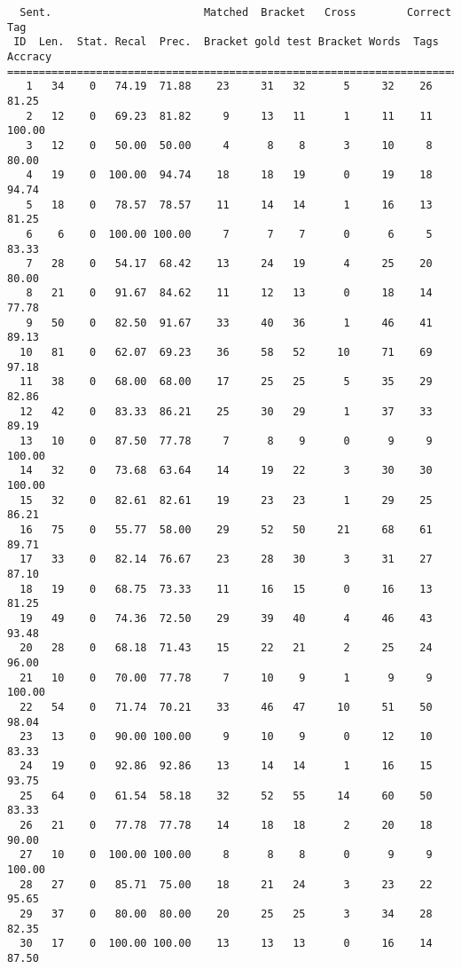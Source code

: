\scriptsize
\begin{verbatim}
  Sent.                        Matched  Bracket   Cross        Correct Tag
 ID  Len.  Stat. Recal  Prec.  Bracket gold test Bracket Words  Tags Accracy
============================================================================
   1   34    0   74.19  71.88    23     31   32      5     32    26    81.25
   2   12    0   69.23  81.82     9     13   11      1     11    11   100.00
   3   12    0   50.00  50.00     4      8    8      3     10     8    80.00
   4   19    0  100.00  94.74    18     18   19      0     19    18    94.74
   5   18    0   78.57  78.57    11     14   14      1     16    13    81.25
   6    6    0  100.00 100.00     7      7    7      0      6     5    83.33
   7   28    0   54.17  68.42    13     24   19      4     25    20    80.00
   8   21    0   91.67  84.62    11     12   13      0     18    14    77.78
   9   50    0   82.50  91.67    33     40   36      1     46    41    89.13
  10   81    0   62.07  69.23    36     58   52     10     71    69    97.18
  11   38    0   68.00  68.00    17     25   25      5     35    29    82.86
  12   42    0   83.33  86.21    25     30   29      1     37    33    89.19
  13   10    0   87.50  77.78     7      8    9      0      9     9   100.00
  14   32    0   73.68  63.64    14     19   22      3     30    30   100.00
  15   32    0   82.61  82.61    19     23   23      1     29    25    86.21
  16   75    0   55.77  58.00    29     52   50     21     68    61    89.71
  17   33    0   82.14  76.67    23     28   30      3     31    27    87.10
  18   19    0   68.75  73.33    11     16   15      0     16    13    81.25
  19   49    0   74.36  72.50    29     39   40      4     46    43    93.48
  20   28    0   68.18  71.43    15     22   21      2     25    24    96.00
  21   10    0   70.00  77.78     7     10    9      1      9     9   100.00
  22   54    0   71.74  70.21    33     46   47     10     51    50    98.04
  23   13    0   90.00 100.00     9     10    9      0     12    10    83.33
  24   19    0   92.86  92.86    13     14   14      1     16    15    93.75
  25   64    0   61.54  58.18    32     52   55     14     60    50    83.33
  26   21    0   77.78  77.78    14     18   18      2     20    18    90.00
  27   10    0  100.00 100.00     8      8    8      0      9     9   100.00
  28   27    0   85.71  75.00    18     21   24      3     23    22    95.65
  29   37    0   80.00  80.00    20     25   25      3     34    28    82.35
  30   17    0  100.00 100.00    13     13   13      0     16    14    87.50

\end{verbatim}
